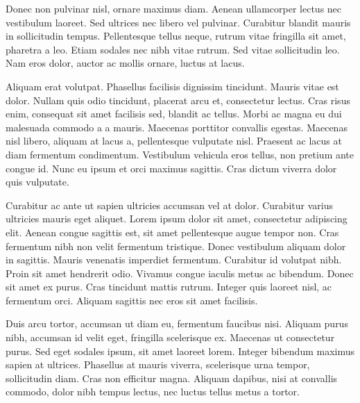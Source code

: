 \documentclass[a4paper, 12pt]{article}
\begin{document}
	Donec non pulvinar nisl, ornare maximus diam. Aenean ullamcorper lectus nec vestibulum laoreet. Sed ultrices nec libero vel pulvinar. Curabitur blandit mauris in sollicitudin tempus. Pellentesque tellus neque, rutrum vitae fringilla sit amet, pharetra a leo. Etiam sodales nec nibh vitae rutrum. Sed vitae sollicitudin leo. Nam eros dolor, auctor ac mollis ornare, luctus at lacus.
	
	Aliquam erat volutpat. Phasellus facilisis dignissim tincidunt. Mauris vitae est dolor. Nullam quis odio tincidunt, placerat arcu et, consectetur lectus. Cras risus enim, consequat sit amet facilisis sed, blandit ac tellus. Morbi ac magna eu dui malesuada commodo a a mauris. Maecenas porttitor convallis egestas. Maecenas nisl libero, aliquam at lacus a, pellentesque vulputate nisl. Praesent ac lacus at diam fermentum condimentum. Vestibulum vehicula eros tellus, non pretium ante congue id. Nunc eu ipsum et orci maximus sagittis. Cras dictum viverra dolor quis vulputate.
	
	Curabitur ac ante ut sapien ultricies accumsan vel at dolor. Curabitur varius ultricies mauris eget aliquet. Lorem ipsum dolor sit amet, consectetur adipiscing elit. Aenean congue sagittis est, sit amet pellentesque augue tempor non. Cras fermentum nibh non velit fermentum tristique. Donec vestibulum aliquam dolor in sagittis. Mauris venenatis imperdiet fermentum. Curabitur id volutpat nibh. Proin sit amet hendrerit odio. Vivamus congue iaculis metus ac bibendum. Donec sit amet ex purus. Cras tincidunt mattis rutrum. Integer quis laoreet nisl, ac fermentum orci. Aliquam sagittis nec eros sit amet facilisis.
	
	Duis arcu tortor, accumsan ut diam eu, fermentum faucibus nisi. Aliquam purus nibh, accumsan id velit eget, fringilla scelerisque ex. Maecenas ut consectetur purus. Sed eget sodales ipsum, sit amet laoreet lorem. Integer bibendum maximus sapien at ultrices. Phasellus at mauris viverra, scelerisque urna tempor, sollicitudin diam. Cras non efficitur magna. Aliquam dapibus, nisi at convallis commodo, dolor nibh tempus lectus, nec luctus tellus metus a tortor.
	
\end{document}
